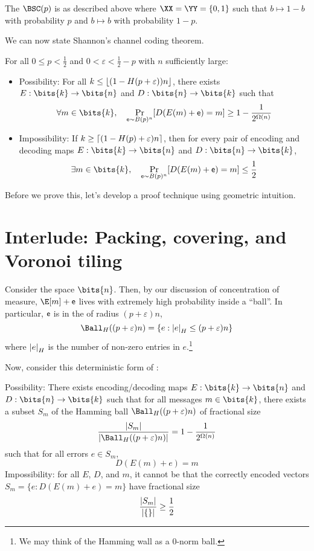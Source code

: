 \documentclass[class=co432,notes,tikz]{agony}
\begin{document}
\begin{defn}
  The  $\BSC(p)$
  is as described above where $\XX = \YY = \{0,1\}$
  such that $b \mapsto 1-b$ with probability $p$
  and $b \mapsto b$ with probability $1-p$.
\end{defn}

We can now state Shannon's channel coding theorem.

\begin{theorem}\label{thm:scc}
  For all $0 \leq p < \frac12$ and $0 < \varepsilon < \frac12-p$
  with $n$ sufficiently large:
  \begin{itemize}
    \item Possibility: For all $k \leq \lfloor(1-H(p+\varepsilon))n\rfloor$,
          there exists $E : \bits{k} \to \bits{n}$ and $D:\bits{n}\to\bits{k}$
          such that
          \[ \forall m \in \bits{k} \qc \Pr_{\rv e\sim B(p)^n}[D(E(m)+\rv e) = m] \geq 1-\frac{1}{2^{\Omega(n)}} \]
    \item Impossibility: If $k \geq \lceil(1-H(p)+\varepsilon)n\rceil$,
          then for every pair of encoding and decoding maps
          $E : \bits{k} \to \bits{n}$ and $D : \bits{n} \to \bits{k}$,
          \[ \exists m\in\bits{k} \qc \Pr_{\rv e\sim B(p)^n}[D(E(m)+\rv e) = m] \leq \frac12 \]
  \end{itemize}
\end{theorem}

Before we prove this, let's develop a proof technique using geometric intuition.

\section{Interlude: Packing, covering, and Voronoi tiling}
Consider the space $\bits{n}$.
Then, by our discussion of concentration of measure, $\E[m]+\rv e$
lives with extremely high probability inside a ``ball''.
In particular, $\mathsf e$ is in the  of radius $(p+\varepsilon)n$,
\[ \Ball_H((p+\varepsilon)n) = \{ e : \abs{e}_H \leq (p+\varepsilon)n \} \]
where $\abs{e}_H$ is the number of non-zero entries in $e$.\footnote{
  We may think of the Hamming wall as a 0-norm ball.}

Now, consider this deterministic form of :

\begin{prop}
  Possibility: There exists encoding/decoding maps $E : \bits{k} \to \bits{n}$
  and $D : \bits{n} \to \bits{k}$ such that for all messages $m \in \bits{k}$,
  there exists a subset $S_m$ of the Hamming ball $\Ball_H((p+\varepsilon)n)$
  of fractional size
  \[ \frac{\abs{S_m}}{\abs{\Ball_H((p+\varepsilon)n)}} = 1-\frac{1}{2^{\Omega(n)}} \]
  such that for all errors $e \in S_m$,
  \[ D(E(m)+e) = m \]
  Impossibility: for all $E$, $D$, and $m$, it cannot be that the correctly encoded vectors
  $S_m = \{e : D(E(m)+e) = m\}$ have fractional size
  \[ \frac{\abs{S_m}}{\abs{\{\}}} \geq \frac12 \]
\end{prop}
\end{document}
